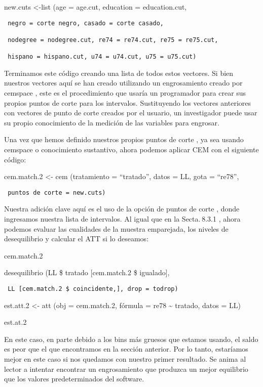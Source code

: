\documentclass[
]{book}
\begin{document}
new.cuts \textless-list (age = age.cut, education = education.cut,

\begin{verbatim}
 negro = corte negro, casado = corte casado,

 nodegree = nodegree.cut, re74 = re74.cut, re75 = re75.cut,

 hispano = hispano.cut, u74 = u74.cut, u75 = u75.cut)
\end{verbatim}

Terminamos este código creando una lista de todos estos vectores. Si bien nuestros vectores aquí se han creado utilizando un engrosamiento creado por cemspace , este es el procedimiento que usaría un programador para crear sus propios puntos de corte para los intervalos. Sustituyendo los vectores anteriores con vectores de punto de corte creados por el usuario, un investigador puede usar su propio conocimiento de la medición de las variables para engrosar.

Una vez que hemos definido nuestros propios puntos de corte , ya sea usando cemspace o conocimiento sustantivo, ahora podemos aplicar CEM con el siguiente código:

cem.match.2 \textless- cem (tratamiento = ``tratado'', datos = LL, gota = ``re78'',

\begin{verbatim}
 puntos de corte = new.cuts)
\end{verbatim}

Nuestra adición clave aquí es el uso de la opción de puntos de corte , donde ingresamos nuestra lista de intervalos. Al igual que en la Secta. 8.3.1 , ahora podemos evaluar las cualidades de la muestra emparejada, los niveles de desequilibrio y calcular el ATT si lo deseamos:

cem.match.2

desequilibrio (LL \$ tratado {[}cem.match.2 \$ igualado{]},

\begin{verbatim}
 LL [cem.match.2 $ coincidente,], drop = todrop)
\end{verbatim}

est.att.2 \textless- att (obj = cem.match.2, fórmula = re78 \textasciitilde{} tratado, datos = LL)

est.at.2

En este caso, en parte debido a los bins más gruesos que estamos usando, el saldo es peor que el que encontramos en la sección anterior. Por lo tanto, estaríamos mejor en este caso si nos quedamos con nuestro primer resultado. Se anima al lector a intentar encontrar un engrosamiento que produzca un mejor equilibrio que los valores predeterminados del software.
\end{document}

